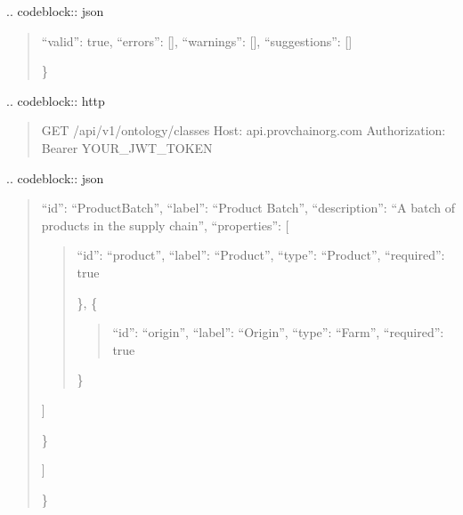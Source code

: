 \documentclass[letterpaper,10pt,english]{sphinxmanual}
\begin{document}
\sphinxAtStartPar
{}
.. code\sphinxhyphen{}block:: json
\begin{quote}
\begin{description}
\sphinxlineitem{\{}
\sphinxAtStartPar
“valid”: true,
“errors”: {[}{]},
“warnings”: {[}{]},
“suggestions”: {[}{]}

\end{description}

\sphinxAtStartPar
\}
\end{quote}

\sphinxAtStartPar
{}
.. code\sphinxhyphen{}block:: http
\begin{quote}

\sphinxAtStartPar
GET /api/v1/ontology/classes
Host: api.provchain\sphinxhyphen{}org.com
Authorization: Bearer YOUR\_JWT\_TOKEN
\end{quote}

\sphinxAtStartPar
{}
.. code\sphinxhyphen{}block:: json
\begin{quote}
\begin{description}
\sphinxlineitem{\{}\begin{description}
\sphinxlineitem{“classes”: {[}}\begin{description}
\sphinxlineitem{\{}
\sphinxAtStartPar
“id”: “ProductBatch”,
“label”: “Product Batch”,
“description”: “A batch of products in the supply chain”,
“properties”: {[}
\begin{quote}
\begin{description}
\sphinxlineitem{\{}
\sphinxAtStartPar
“id”: “product”,
“label”: “Product”,
“type”: “Product”,
“required”: true

\end{description}

\sphinxAtStartPar
\},
\{
\begin{quote}

\sphinxAtStartPar
“id”: “origin”,
“label”: “Origin”,
“type”: “Farm”,
“required”: true
\end{quote}

\sphinxAtStartPar
\}
\end{quote}

\sphinxAtStartPar
{]}

\end{description}

\sphinxAtStartPar
\}

\end{description}

\sphinxAtStartPar
{]}

\end{description}

\sphinxAtStartPar
\}
\end{quote}
\end{document}
